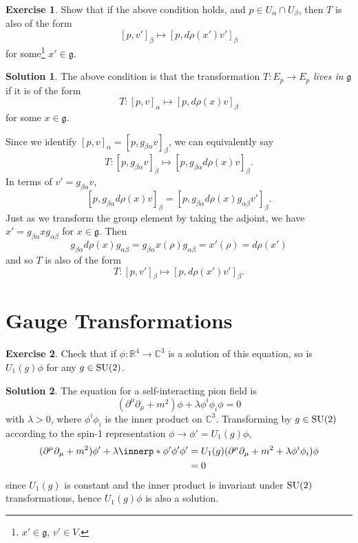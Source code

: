 \documentclass[11pt, a4paper]{report}
\theoremstyle{definition}
\newtheorem{exercise}{Exercise}[part]
\newtheorem{solution}{Solution}[part]
\newenvironment{ex}{\begin{exercise}}{\end{exercise}\pagebreak[1]}
\newenvironment{sol}{\begin{solution}}{\end{solution}\pagebreak[3]}
\newcommand*{\SU}{\ensuremath\text{SU}}
\begin{document}
\begin{ex}

Show that if the above condition holds, and $p \in U_\alpha \cap U_\beta$, then $T$ is also of the form
\[
    {[p, v']}_\beta \mapsto {[p, d\rho(x') v']}_\beta
\]
for some\footnote{$x' \in \mathfrak{g}$, $v' \in V$.} $x' \in \mathfrak{g}$.

\end{ex}

\begin{sol}

The above condition is that the transformation $T: E_p \to E_p$ \emph{lives in} $\mathfrak{g}$ if it is of the form
\[
    T: {[p, v]}_\alpha \mapsto {[p, d\rho(x) v]}_\beta
\]
for some $x \in \mathfrak{g}$.

Since we identify ${[p, v]}_\alpha = {[p, g_{\beta\alpha} v]}_\beta$, we can equivalently say
\[
    T: {[p, g_{\beta\alpha} v]}_\beta \mapsto {[p, g_{\beta\alpha} d\rho(x) v]}_\beta.
\]
In terms of $v' = g_{\beta\alpha} v$,
\[
    {[p, g_{\beta\alpha} d\rho(x) v]}_\beta =
    {[p, g_{\beta\alpha} d\rho(x) g_{\alpha\beta} v']}_\beta.
\]
Just as we transform the group element by taking the adjoint, we have $x' = g_{\beta\alpha} x g_{\alpha\beta}$ for $x \in \mathfrak{g}$. Then
\[
    g_{\beta\alpha} d\rho(x) g_{\alpha\beta}
        = g_{\beta\alpha} x(\rho) g_{\alpha\beta}
        = x'(\rho)
        = d\rho(x')
\]
and so $T$ is also of the form
\[
    T: {[p, v']}_\beta \mapsto {[p, d\rho(x') v']}_\beta.
\]

\end{sol}

\section{Gauge Transformations}

\begin{ex}

Check that if $\phi: \mathbb{R}^4 \to \mathbb{C}^3$ is a solution of this equation, so is $U_1(g) \phi$ for any $g \in \SU(2)$.

\end{ex}

\begin{sol}

The equation for a self-interacting pion field is
\[
    (\partial^\mu \partial_\mu + m^2) \phi + \lambda \phi^i \phi_i \phi = 0
\]
with $\lambda > 0$, where $\phi^i \phi_i$ is the inner product on $\mathbb{C}^3$.
Transforming by $g \in \SU(2)$ according to the spin-1 representation $\phi \to \phi' = U_1(g) \phi$,
\begin{align*}
    (\partial^\mu \partial_\mu + m^2) \phi' + \lambda \innerp*{\phi'}{\phi'} \phi'
        &= U_1(g)(\partial^\mu \partial_\mu + m^2 + \lambda \phi^i \phi_i) \phi \\
        &= 0
\end{align*}
since $U_1(g)$ is constant and the inner product is invariant under $\SU(2)$ transformations, hence $U_1(g) \phi$ is also a solution.

\end{sol}
\end{document}
